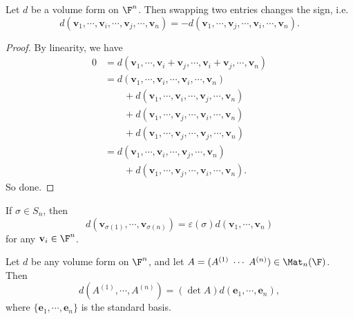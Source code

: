\documentclass[a4paper]{article}
\begin{document}
\begin{lemma}
  Let $d$ be a volume form on $\F^n$. Then swapping two entries changes the sign, i.e.
  \[
    d (\mathbf{v}_1, \cdots, \mathbf{v}_i, \cdots, \mathbf{v}_j,\cdots, \mathbf{v}_n) = -d(\mathbf{v}_1, \cdots, \mathbf{v}_j, \cdots, \mathbf{v}_i, \cdots, \mathbf{v}_n).
  \]
\end{lemma}

\begin{proof}
  By linearity, we have
  \begin{align*}
    0 &= d(\mathbf{v}_1, \cdots, \mathbf{v}_i + \mathbf{v}_j, \cdots, \mathbf{v}_i + \mathbf{v}_j, \cdots,\mathbf{v}_n) \\
    &= d(\mathbf{v}_1, \cdots, \mathbf{v}_i, \cdots, \mathbf{v}_i, \cdots, \mathbf{v}_n)\\
    &\quad\quad+ d(\mathbf{v}_1, \cdots, \mathbf{v}_i, \cdots, \mathbf{v}_j, \cdots, \mathbf{v}_n)\\
    &\quad\quad+ d(\mathbf{v}_1, \cdots, \mathbf{v}_j, \cdots, \mathbf{v}_i, \cdots, \mathbf{v}_n)\\
    &\quad\quad+ d(\mathbf{v}_1, \cdots, \mathbf{v}_j, \cdots, \mathbf{v}_j, \cdots, \mathbf{v}_n)\\
    &= d(\mathbf{v}_1, \cdots, \mathbf{v}_i, \cdots, \mathbf{v}_j, \cdots, \mathbf{v}_n)\\
    &\quad\quad+ d(\mathbf{v}_1, \cdots, \mathbf{v}_j, \cdots, \mathbf{v}_i, \cdots, \mathbf{v}_n).
  \end{align*}
  So done.
\end{proof}

\begin{cor}
  If $\sigma \in S_n$, then
  \[
    d(\mathbf{v}_{\sigma(1)}, \cdots, \mathbf{v}_{\sigma(n)}) = \varepsilon(\sigma) d(\mathbf{v}_1,\cdots, \mathbf{v}_n)
  \]
  for any $\mathbf{v}_i \in \F^n$.
\end{cor}

\begin{thm}
  Let $d$ be any volume form on $\F^n$, and let $A = (A^{(1)}\;\cdots \;A^{(n)}) \in \Mat_n(\F)$. Then
  \[
    d(A^{(1)}, \cdots, A^{(n)}) = (\det A) d(\mathbf{e}_1, \cdots, \mathbf{e}_n),
  \]
  where $\{\mathbf{e}_1, \cdots, \mathbf{e}_n\}$ is the standard basis.
\end{thm}
\end{document}

